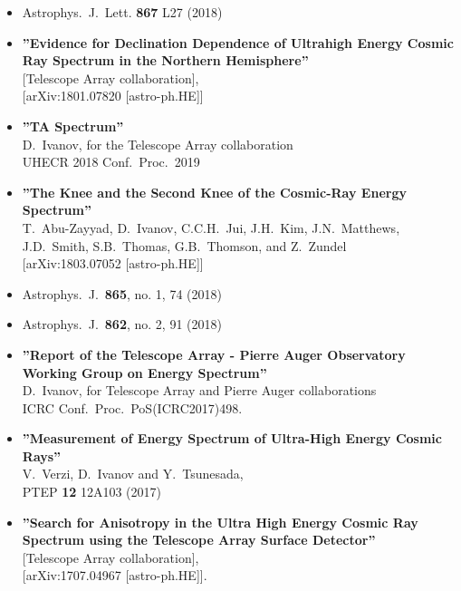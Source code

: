 \documentclass[12pt,letterpaper]{article} %
\begin{document}
{\begin{itemize}
	\item Astrophys.\ J.\ Lett.  {\bf 867} L27 (2018)
	
	\item {\bf ''Evidence for Declination Dependence of Ultrahigh Energy Cosmic Ray Spectrum in the Northern Hemisphere''}
    \\{}[Telescope Array collaboration],
    \\{}[arXiv:1801.07820 [astro-ph.HE]]
	
	\item {\bf ''TA Spectrum''}
	\\{}D.~Ivanov, for the Telescope Array collaboration
	\\{}UHECR 2018 Conf.\ Proc.\ 2019
	
	\item {\bf ''The Knee and the Second Knee of the Cosmic-Ray Energy Spectrum''}
	\\{} T.~Abu-Zayyad, D.~Ivanov, C.C.H.~Jui, J.H.~Kim, J.N.~Matthews, J.D.~Smith, S.B.~Thomas, G.B.~Thomson, and Z.~Zundel
	\\{} [arXiv:1803.07052 [astro-ph.HE]]
	
	\item Astrophys.\ J.\  {\bf 865}, no. 1, 74 (2018)
	\item Astrophys.\ J.\  {\bf 862}, no. 2, 91 (2018)
	
	\item {\bf ''Report of the Telescope Array - Pierre Auger Observatory Working Group on Energy Spectrum''}
	\\{}D.~Ivanov, for Telescope Array and Pierre Auger collaborations
	\\{}ICRC Conf.\ Proc.\ PoS(ICRC2017)498. %
	
	\item {\bf ''Measurement of Energy Spectrum of Ultra-High Energy Cosmic Rays''}
	\\{}V.~Verzi, D.~Ivanov and Y.~Tsunesada,
	\\{}PTEP {\bf 12} 12A103 (2017)
		
	\item {\bf ''Search for Anisotropy in the Ultra High Energy Cosmic Ray Spectrum using the Telescope Array Surface Detector''}
	\\{}[Telescope Array collaboration],
    \\{}[arXiv:1707.04967 [astro-ph.HE]].
	

\end{itemize}}
\end{document}
